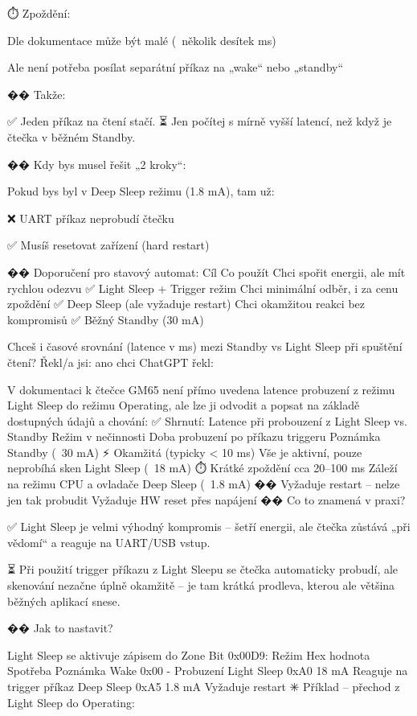⏱️ Zpoždění:

    Dle dokumentace může být malé (~několik desítek ms)

    Ale není potřeba posílat separátní příkaz na „wake“ nebo „standby“

�� Takže:

    ✅ Jeden příkaz na čtení stačí.
    ⏳ Jen počítej s mírně vyšší latencí, než když je čtečka v běžném Standby.

�� Kdy bys musel řešit „2 kroky“:

    Pokud bys byl v Deep Sleep režimu (1.8 mA), tam už:

        ❌ UART příkaz neprobudí čtečku

        ✅ Musíš resetovat zařízení (hard restart)

�� Doporučení pro stavový automat:
Cíl	Co použít
Chci spořit energii, ale mít rychlou odezvu	✅ Light Sleep + Trigger režim
Chci minimální odběr, i za cenu zpoždění	✅ Deep Sleep (ale vyžaduje restart)
Chci okamžitou reakci bez kompromisů	✅ Běžný Standby (30 mA)

Chceš i časové srovnání (latence v ms) mezi Standby vs Light Sleep při spuštění čtení?
Řekl/a jsi:
ano chci
ChatGPT řekl:

V dokumentaci k čtečce GM65 není přímo uvedena latence probuzení z režimu Light Sleep do režimu Operating, ale lze ji odvodit a popsat na základě dostupných údajů a chování:
✅ Shrnutí: Latence při probouzení z Light Sleep vs. Standby
Režim v nečinnosti	Doba probuzení po příkazu triggeru	Poznámka
Standby (~30 mA)	⚡ Okamžitá (typicky < 10 ms)	Vše je aktivní, pouze neprobíhá sken
Light Sleep (~18 mA)	⏱️ Krátké zpoždění cca 20–100 ms	Záleží na režimu CPU a ovladače
Deep Sleep (~1.8 mA)	�� Vyžaduje restart – nelze jen tak probudit	Vyžaduje HW reset přes napájení
�� Co to znamená v praxi?

    ✅ Light Sleep je velmi výhodný kompromis – šetří energii, ale čtečka zůstává „při vědomí“ a reaguje na UART/USB vstup.

    ⏳ Při použití trigger příkazu z Light Sleepu se čtečka automaticky probudí, ale skenování nezačne úplně okamžitě – je tam krátká prodleva, kterou ale většina běžných aplikací snese.

�� Jak to nastavit?

Light Sleep se aktivuje zápisem do Zone Bit 0x00D9:
Režim	Hex hodnota	Spotřeba	Poznámka
Wake	0x00	-	Probuzení
Light Sleep	0xA0	18 mA	Reaguje na trigger příkaz
Deep Sleep	0xA5	1.8 mA	Vyžaduje restart
✳️ Příklad – přechod z Light Sleep do Operating:


